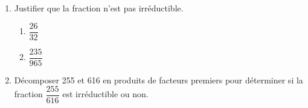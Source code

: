 \documentclass[exercice]{thedocument}%
\begin{document}
%
\begin{enumerate}
    \item Justifier que la fraction n'est pas irréductible.
    \begin{enumerate}
		\item $\dfrac{26}{32}$
		\item $\dfrac{235}{965}$
	\end{enumerate}
    \item Décomposer 255 et 616 en produits de facteurs premiers pour déterminer si
    la fraction $\dfrac{255}{616}$ est irréductible ou non.
\end{enumerate}
\end{document}
